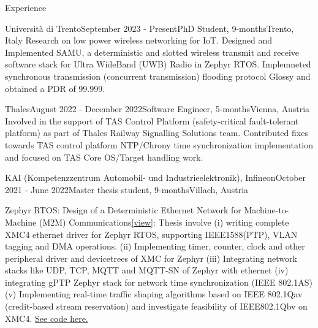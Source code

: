 \documentclass[
	a4paper, %
	11pt, %
]{resume} %
\begin{document}

\begin{rSection}{Experience}

    \begin{rSubsection}{Università di Trento}{September 2023 - Present}{PhD Student, 9-months}{Trento, Italy}
    Research on low power wireless networking for IoT. Designed and Implemented SAMU, a deterministic and slotted
    wireless transmit and receive software stack for Ultra WideBand (UWB) Radio in Zephyr RTOS. Implemneted synchronous transmission 
    (concurrent transmission) flooding protocol Glossy and obtained a PDR of 99.999.

    
    \end{rSubsection}

    \begin{rSubsection}{Thales}{August 2022 - December 2022}{Software Engineer, 5-months}{Vienna, Austria}
        Involved in the support of TAS Control Platform (safety-critical fault-tolerant platform) as part 
        of Thales Railway Signalling Solutions team. Contributed fixes towards TAS control platform NTP/Chrony time 
        synchronization implementation and focused on TAS Core OS/Target handling work.
		
    \end{rSubsection}

	\begin{rSubsection}{KAI (Kompetenzzentrum Automobil- und Industrieelektronik), Infineon}{October 2021 - June 2022}{Master thesis student, 9-months}{Villach, Austria}

            {\color{orange} Zephyr RTOS: Design of a Deterministic Ethernet Network for Machine-to-Machine (M2M) Communications}\href{https://www.linkedin.com/in/sebinsphilip/overlay/1635506986689/single-media-viewer/?type=DOCUMENT&profileId=ACoAAAm-xe0BCYwezV-q9pIlhl7WYDQHRff8kIE}{[view]}: Thesis involve (i) writing complete XMC4 ethernet driver for Zephyr RTOS, supporting IEEE1588(PTP), VLAN tagging and DMA operations. (ii) Implementing timer, counter, clock and other peripheral driver and devicetrees of XMC for Zephyr (iii) Integrating network stacks like UDP, TCP, MQTT and MQTT-SN of Zephyr with ethernet (iv) integrating gPTP Zephyr stack for network time synchronization (IEEE 802.1AS) (v) Implementing real-time traffic shaping algorithms based on IEEE 802.1Qav (credit-based stream reservation) and investigate feasibility of IEEE802.1Qbv on XMC4.
            \href{https://github.com/sebinsphilip/zephyr\_xmc}{ See code here.}
		

\end{rSubsection}
\end{rSection}
\end{document}
